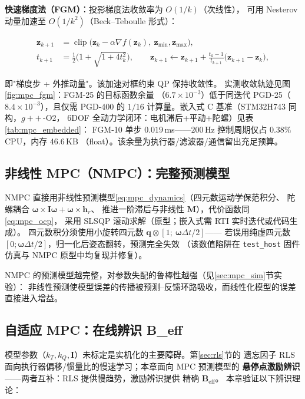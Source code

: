 \textbf{快速梯度法（FGM）}：投影梯度法收敛率为 $O(1/k)$（次线性），
可用 Nesterov 动量加速至 $O(1/k^2)$（Beck--Teboulle 形式）：

\begin{align}
    \mathbf{z}_{k+1} &= \operatorname{clip}\!\big(\mathbf{z}_k - \alpha\nabla f(\mathbf{z}_k),
        \ \mathbf{z}_{\min},\mathbf{z}_{\max}\big),
    \label{eq:fgm_step}\\
    t_{k+1} &= \tfrac{1}{2}\Big(1+\sqrt{1+4t_k^2}\Big),\qquad
    \mathbf{z}_{k+1} \leftarrow \mathbf{z}_{k+1}
        + \frac{t_k-1}{t_{k+1}}\big(\mathbf{z}_{k+1}-\mathbf{z}_k\big),
    \label{eq:fgm}
\end{align}

即"梯度步 + 外推动量"。该加速对框约束 QP 保持收敛性\cite{mayne2000constrained}。
实测收敛轨迹见图\ref{fig:mpc_fgm}：FGM-25 的目标函数余量
（$6.7\times10^{-3}$）低于同迭代 PGD-25（$8.4\times10^{-3}$），且仅需
PGD-400 的 $1/16$ 计算量。嵌入式 C 基准（STM32H743 同构，$g++$\,-O2，
6DOF 全动力学闭环：电机滞后+平动+陀螺）见表\ref{tab:mpc_embedded}：
FGM-10 单步 $0.019$\,ms——$200$\,Hz 控制周期仅占 $0.38\%$ CPU，内存 46.6\,KB
（float）。该余量为执行器/滤波器/通信留出充足预算。

\subsection{非线性 MPC（NMPC）：完整预测模型}
\label{sec:nmpc}

NMPC 直接用非线性预测模型\eqref{eq:mpc_dynamics}（四元数运动学保范积分、
陀螺耦合 $\boldsymbol{\omega}\times\mathbf{I}\boldsymbol{\omega}+\boldsymbol{\omega}\times\mathbf{h}_r$、
推进一阶滞后与非线性 $\boldsymbol{M}$），代价函数同\eqref{eq:mpc_ocp}，
采用 SLSQP 滚动求解（原型；嵌入式需 RTI 实时迭代或代码生成）。
四元数积分须使用小旋转四元数 $\mathbf{q}\otimes[1;\ \boldsymbol{\omega}\Delta t/2]$——
若误用纯虚四元数 $[0;\boldsymbol{\omega}\Delta t/2]$，归一化后姿态翻转，预测完全失效
（该数值陷阱在 \texttt{test\_host} 固件仿真与 NMPC 原型中均复现并修复）。

NMPC 的预测模型越完整，对参数失配的鲁棒性越强（见\ref{sec:mpc_sim}节实验）：
非线性预测使模型误差的传播被预测--反馈环路吸收，而线性化模型的误差直接进入增益。

\subsection{自适应 MPC：在线辨识 B\_eff}
\label{sec:mpc_adapt}

模型参数（$k_T,k_Q,\mathbf{I}$）未标定是实机化的主要障碍。第\ref{sec:rls}节的
遗忘因子 RLS 面向执行器偏移/惯量比的慢速学习；本章面向 MPC 预测模型的
\textbf{悬停点激励辨识}——两者互补：RLS 提供慢趋势，激励辨识提供
精确 $\mathbf{B}_{\mathrm{eff}}$。
本章验证以下辨识理论：


